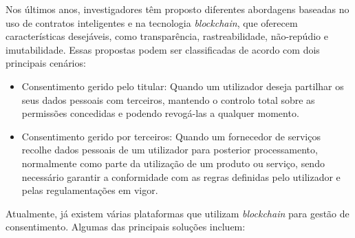 Nos últimos anos, investigadores têm proposto diferentes abordagens baseadas no uso de contratos inteligentes e na tecnologia \textit{blockchain}, que oferecem características desejáveis, como transparência, rastreabilidade, não-repúdio e imutabilidade. Essas propostas podem ser classificadas de acordo com dois principais cenários:

\begin{itemize}
    \item Consentimento gerido pelo titular: Quando um utilizador deseja partilhar os seus dados pessoais com terceiros, mantendo o controlo total sobre as permissões concedidas e podendo revogá-las a qualquer momento.
    \item Consentimento gerido por terceiros: Quando um fornecedor de serviços recolhe dados pessoais de um utilizador para posterior processamento, normalmente como parte da utilização de um produto ou serviço, sendo necessário garantir a conformidade com as regras definidas pelo utilizador e pelas regulamentações em vigor.
\end{itemize}

Atualmente, já existem várias plataformas que utilizam \textit{blockchain} para gestão de consentimento. 
Algumas das principais soluções incluem:

